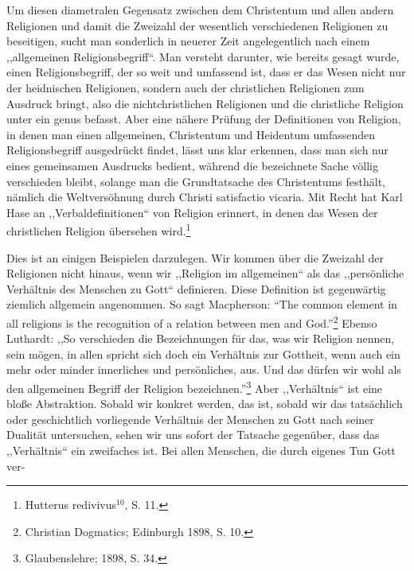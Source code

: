 Um diesen diametralen Gegensatz zwischen dem Christentum und allen andern Religionen und damit die Zweizahl der wesentlich verschiedenen Religionen zu beseitigen, sucht man sonderlich in neuerer Zeit angelegentlich nach einem ,,allgemeinen Religionsbegriff``. Man versteht darunter, wie bereits gesagt wurde, einen Religionsbegriff, der so weit und umfassend ist, dass er das Wesen nicht nur der heidnischen Religionen, sondern auch der christlichen Religionen zum Ausdruck bringt, also die nichtchristlichen Religionen und die christliche Religion unter ein genus befasst. Aber eine nähere Prüfung der Definitionen von Religion, in denen man einen allgemeinen, Christentum und Heidentum umfassenden Religionsbegriff ausgedrückt findet, lässt uns klar erkennen, dass man sich nur eines gemeinsamen Ausdrucks bedient, während die bezeichnete Sache völlig verschieden bleibt, solange man die Grundtatsache des Christentums festhält, nämlich die Weltversöhnung durch Christi satisfactio vicaria. Mit Recht hat Karl Hase an ,,Verbaldefinitionen`` von Religion erinnert, in denen das Wesen der christlichen Religion übersehen wird.\footnote{Hutterus redivivus$^{10}$, S. 11.}\par Dies ist an einigen Beispielen darzulegen. Wir kommen über die Zweizahl der Religionen nicht hinaus, wenn wir ,,Religion im allgemeinen`` als das ,,persönliche Verhältnis des Menschen zu Gott`` definieren. Diese Definition ist gegenwärtig ziemlich allgemein angenommen. So sagt Macpherson: “The common element in all religions is the recognition of a relation between men and God.”\footnote{Christian Dogmatics; Edinburgh 1898, S. 10.} Ebenso Luthardt: ,,So verschieden die Bezeichnungen für das, was wir Religion nennen, sein mögen, in allen spricht sich doch ein Verhältnis zur Gottheit, wenn auch ein mehr oder minder innerliches und persönliches, aus. Und das dürfen wir wohl als den allgemeinen Begriff der Religion bezeichnen.”\footnote{Glaubenslehre; 1898, S. 34.} Aber ,,Verhältnis`` ist eine bloße Abstraktion. Sobald wir konkret werden, das ist, sobald wir das tatsächlich oder geschichtlich vorliegende Verhältnis der Menschen zu Gott nach seiner Dualität untersuchen, sehen wir uns sofort der Tatsache gegenüber, dass das ,,Verhältnis`` ein zweifaches ist. Bei allen Menschen, die durch eigenes Tun Gott ver-